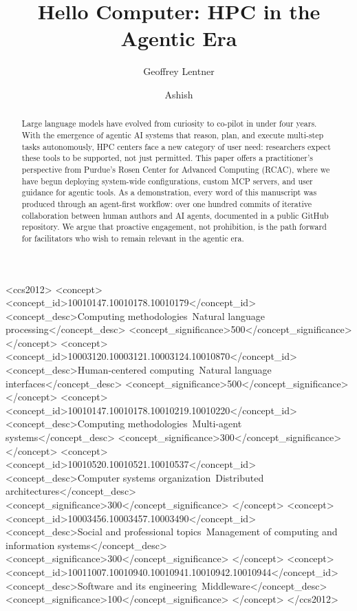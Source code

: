 \documentclass[sigconf]{acmart}
\begin{document}
\title{Hello Computer: HPC in the Agentic Era}

\author{Geoffrey Lentner}

\author{Ashish}

\renewcommand{\shortauthors}{Lentner and Ashish}

\begin{abstract}
Large language models have evolved from curiosity to co-pilot in under four years.
With the emergence of agentic AI systems that reason, plan, and execute multi-step
tasks autonomously, HPC centers face a new category of user need: researchers expect
these tools to be supported, not just permitted. This paper offers
a practitioner's perspective from Purdue's Rosen Center for Advanced Computing (RCAC),
where we have begun deploying system-wide configurations, custom MCP servers, and user
guidance for agentic tools. As a demonstration, every word of this manuscript was
produced through an agent-first workflow: over one hundred commits of iterative collaboration
between human authors and AI agents, documented in a public GitHub repository. We argue
that proactive engagement, not prohibition, is the path forward for facilitators who
wish to remain relevant in the agentic era.
\end{abstract}

\begin{CCSXML}
<ccs2012>
   <concept>
       <concept_id>10010147.10010178.10010179</concept_id>
       <concept_desc>Computing methodologies~Natural language processing</concept_desc>
       <concept_significance>500</concept_significance>
       </concept>
   <concept>
       <concept_id>10003120.10003121.10003124.10010870</concept_id>
       <concept_desc>Human-centered computing~Natural language interfaces</concept_desc>
       <concept_significance>500</concept_significance>
       </concept>
   <concept>
       <concept_id>10010147.10010178.10010219.10010220</concept_id>
       <concept_desc>Computing methodologies~Multi-agent systems</concept_desc>
       <concept_significance>300</concept_significance>
       </concept>
   <concept>
       <concept_id>10010520.10010521.10010537</concept_id>
       <concept_desc>Computer systems organization~Distributed architectures</concept_desc>
       <concept_significance>300</concept_significance>
       </concept>
   <concept>
       <concept_id>10003456.10003457.10003490</concept_id>
       <concept_desc>Social and professional topics~Management of computing and information systems</concept_desc>
       <concept_significance>300</concept_significance>
       </concept>
   <concept>
       <concept_id>10011007.10010940.10010941.10010942.10010944</concept_id>
       <concept_desc>Software and its engineering~Middleware</concept_desc>
       <concept_significance>100</concept_significance>
       </concept>
 </ccs2012>
\end{CCSXML}
\end{document}
